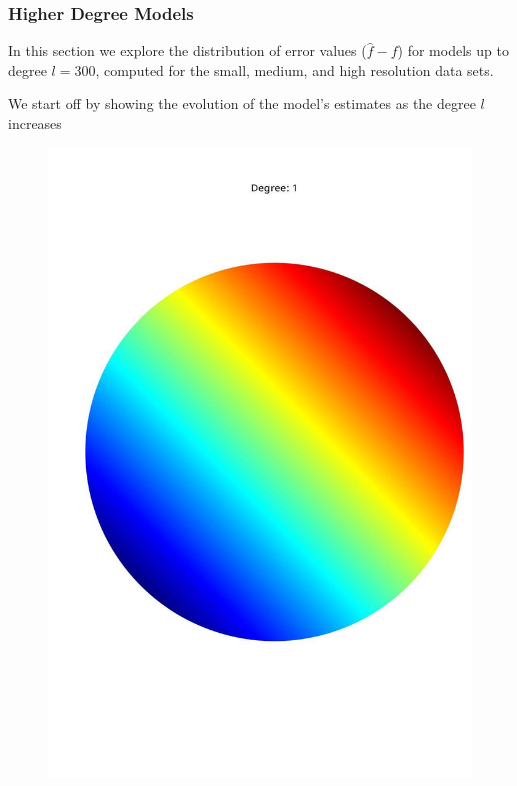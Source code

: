 \documentclass[a4paper]{article}
\theoremstyle{definition}
\begin{document}
\subsubsection{Higher Degree Models}
In this section we explore the distribution of error values ($\hat f - f$) for models up to degree $l = 300$, computed for the small, medium, and high resolution data sets.

We start off by showing the evolution of the model's estimates as the degree $l$ increases

\newpage

\begin{figure}[h!]
    \begin{minipage}{.245\textwidth}
        \centering
        \includegraphics[width=0.95\linewidth]{media/med_1.jpg}
        \label{fig:med1}
    \end{minipage}
    \begin{minipage}{.245\textwidth}

\end{minipage}
\end{figure}
\end{document}
